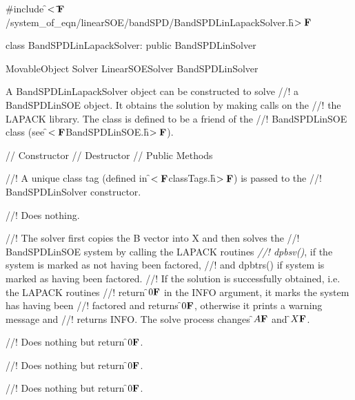 
\indent \#include \f$<\tilde{ }{\bf F}$/system\_of\_eqn/linearSOE/bandSPD/BandSPDLinLapackSolver.h\f$>{\bf F}$

\indent class BandSPDLinLapackSolver: public BandSPDLinSolver

\indent MovableObject
\indent\indent  Solver
\indent\indent\indent LinearSOESolver
\indent\indent\indent\indent BandSPDLinSolver
\indent\indent\indent\indent{}

\indent A BandSPDLinLapackSolver object can be constructed to solve
//! a BandSPDLinSOE object. It obtains the solution by making calls on the
//! the LAPACK library. The class is defined to be a friend of the 
//! BandSPDLinSOE class (see \f$<{\bf F}$BandSPDLinSOE.h\f$>{\bf F}$).


\indent\indent // Constructor
\indent{}
\indent\indent // Destructor
\indent{}
\indent\indent // Public Methods
\indent{}
\indent{}
\indent{} 
\indent{} 


//! A unique class tag (defined in \f$<{\bf F}$classTags.h\f$>{\bf F}$) is passed to the
//! BandSPDLinSolver constructor.


//! Does nothing.

//! The solver first copies the B vector into X and then solves the
//! BandSPDLinSOE system by calling the LAPACK routines {\em 
//! dpbsv()}, if the system is marked as not having been factored,
//! and dpbtrs() if system is marked as having been factored. 
//! If the solution is successfully obtained, i.e. the LAPACK routines
//! return \f$0{\bf F}$ in the INFO argument, it marks the system has having been 
//! factored and returns \f$0{\bf F}$, otherwise it prints a warning message and
//! returns INFO. The solve process changes \f$A{\bf F}$ and \f$X{\bf F}$.   


//! Does nothing but return \f$0{\bf F}$.

//! Does nothing but return \f$0{\bf F}$.

//! Does nothing but return \f$0{\bf F}$.



